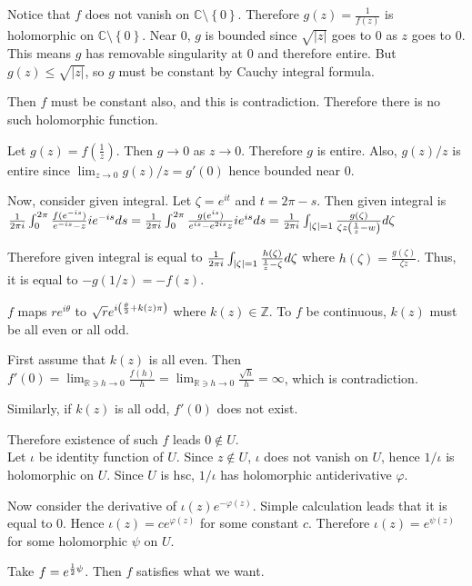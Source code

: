 \begin{problem}[4.1] \hfill

	Notice that $f$ does not vanish on $\mathbb{C}\setminus \left\{ 0 \right\}$. Therefore $g(z) = \frac{1}{f(z)}$ is holomorphic on $\mathbb{C} \setminus \left\{ 0 \right\}$.
	Near $0$, $g$ is bounded since $\sqrt{|z|}$ goes to $0$ as $z$ goes to $0$. This means $g$ has removable singularity at $0$ and therefore entire. But $g(z) \leq \sqrt{|z|}$, so $g$ must be constant by Cauchy integral formula.

	Then $f$ must be constant also, and this is contradiction. Therefore there is no such holomorphic function.

\end{problem}

\begin{problem}[4.2] \hfill

	Let $g(z) = f\left( \frac{1}{z} \right)$. Then $g \rightarrow 0$ as $z \rightarrow 0$. Therefore $g$ is entire.
	Also, $g(z)/z$ is entire since $\lim_{z\rightarrow 0} g(z)/z = g'(0)$ hence bounded near $0$.

	Now, consider given integral. Let $\zeta = e^{it}$ and $t = 2\pi - s$. Then given integral is $\frac{1}{2\pi i} \int_0^{2\pi} \frac{f(e^{-is})}{e^{-is} - z}ie^{-is}ds = \frac{1}{2\pi i} \int_0^{2\pi}\frac{g(e^{is})}{e^{is}-e^{2is}z}ie^{is} ds = \frac{1}{2\pi i} \int_{|\zeta| = 1} \frac{g(\zeta)}{\zeta z \left( {1 \over z} - w \right)} d\zeta$
	
	Therefore given integral is equal to $\frac{1}{2\pi i} \int_{|\zeta| = 1} \frac{h(\zeta)}{ {1 \over z} - \zeta} d\zeta$ where $h(\zeta) = \frac{g(\zeta)}{\zeta z}$.
	Thus, it is equal to $-g(1/z) = -f(z)$.
\end{problem}

\begin{problem}[4.3] \hfill

	$f$ maps $re^{i\theta}$ to $\sqrt{r} e^{i\left( {\theta \over 2} + k(z) \pi \right)}$ where $k(z) \in \mathbb{Z}$. To $f$ be continuous, $k(z)$ must be all even or all odd.

	First assume that $k(z)$ is all even. Then $f'(0) = \lim_{\mathbb{R} \ni h \rightarrow 0} \frac{f(h)}{h} = \lim_{\mathbb{R} \ni h \rightarrow 0} \frac{\sqrt{h}}{h} = \infty$, which is contradiction.

	Similarly, if $k(z)$ is all odd, $f'(0)$ does not exist. 

	Therefore existence of such $f$ leads $0 \notin U$. \\

	Let $\iota$ be identity function of $U$. Since $z \notin U$, $\iota$ does not vanish on $U$, hence $1/\iota$ is holomorphic on $U$. Since $U$ is hsc, $1/\iota$ has holomorphic antiderivative $\varphi$.

	Now consider the derivative of $\iota(z)e^{-\varphi(z)}$. Simple calculation leads that it is equal to 0. Hence $\iota(z) = c e^{\varphi(z)}$ for some constant $c$. Therefore $\iota(z) = e^{\psi(z)}$ for some holomorphic $\psi$ on $U$.

	Take $f = e^{ {1\over 2} \psi  }$. Then $f$ satisfies what we want.
\end{problem}

